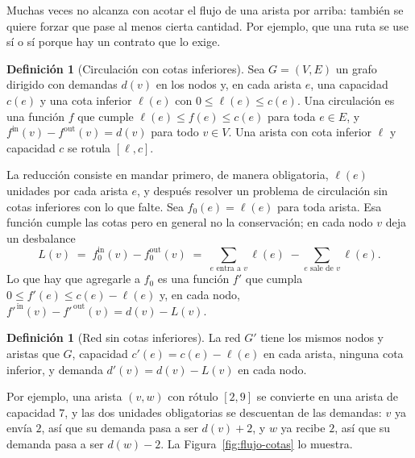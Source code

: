 \documentclass[12pt, spanish, oneside, openany]{book}
\theoremstyle{uprightplain}
\theoremstyle{definition}
\newtheorem{definicion}[teorema]{Definición}
\theoremstyle{remark}
\theoremstyle{definition}
\begin{document}
Muchas veces no alcanza con acotar el flujo de una arista por arriba: también se quiere forzar que pase al menos cierta cantidad. Por ejemplo, que una ruta se use sí o sí porque hay un contrato que lo exige.

\begin{definicion}[Circulación con cotas inferiores]
\label{def:flujo-cotas-inferiores}
Sea $G=(V,E)$ un grafo dirigido con demandas $d(v)$ en los nodos y, en cada arista $e$, una capacidad $c(e)$ y una cota inferior $\ell(e)$ con $0\le\ell(e)\le c(e)$. Una circulación es una función $f$ que cumple $\ell(e)\le f(e)\le c(e)$ para toda $e\in E$, y $f^{\mathrm{in}}(v)-f^{\mathrm{out}}(v)=d(v)$ para todo $v\in V$. Una arista con cota inferior $\ell$ y capacidad $c$ se rotula $[\ell,c]$.
\end{definicion}

La reducción consiste en mandar primero, de manera obligatoria, $\ell(e)$ unidades por cada arista $e$, y después resolver un problema de circulación sin cotas inferiores con lo que falte. Sea $f_0(e)=\ell(e)$ para toda arista. Esa función cumple las cotas pero en general no la conservación; en cada nodo $v$ deja un desbalance
\[
L(v)\;=\;f_0^{\mathrm{in}}(v)-f_0^{\mathrm{out}}(v)\;=\;\sum_{e\text{ entra a }v}\ell(e)\;-\sum_{e\text{ sale de }v}\ell(e).
\]
Lo que hay que agregarle a $f_0$ es una función $f'$ que cumpla $0\le f'(e)\le c(e)-\ell(e)$ y, en cada nodo, $f'^{\,\mathrm{in}}(v)-f'^{\,\mathrm{out}}(v)=d(v)-L(v)$.

\begin{definicion}[Red sin cotas inferiores]
\label{def:flujo-red-sin-cotas}
La red $G'$ tiene los mismos nodos y aristas que $G$, capacidad $c'(e)=c(e)-\ell(e)$ en cada arista, ninguna cota inferior, y demanda $d'(v)=d(v)-L(v)$ en cada nodo.
\end{definicion}

Por ejemplo, una arista $(v,w)$ con rótulo $[2,9]$ se convierte en una arista de capacidad $7$, y las dos unidades obligatorias se descuentan de las demandas: $v$ ya envía $2$, así que su demanda pasa a ser $d(v)+2$, y $w$ ya recibe $2$, así que su demanda pasa a ser $d(w)-2$. La Figura~\ref{fig:flujo-cotas} lo muestra.
\end{document}
